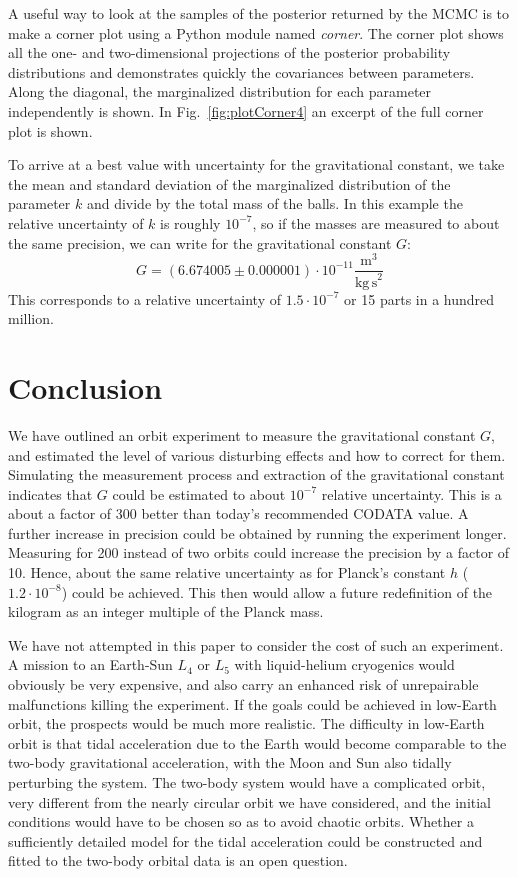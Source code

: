 \documentclass[prb,preprint]{revtex4-1}
\begin{document}
A useful way to look at the samples of the posterior returned by the MCMC is to make a corner plot using a Python module named \textit{corner}.\cite{corner} The corner plot shows all the one- and two-dimensional projections of the posterior probability distributions and demonstrates quickly the covariances between parameters. Along the diagonal, the marginalized distribution for each parameter independently is shown.
In Fig.~\ref{fig:plotCorner4} an excerpt of the full corner plot is shown. 

To arrive at a best value with uncertainty for the gravitational constant, we take the mean and standard deviation of the marginalized distribution of the parameter $k$ and divide by the total mass of the balls. In this example the relative uncertainty of $k$ is roughly $10^{-7}$, so if the masses are measured to about the same precision, we can write for the gravitational constant $G$:
\begin{equation}\label{Gfit}
G = \left(6.674005 \pm 0.000001 \right) \cdot 10^{-11}  \frac{\mathrm{m}^3}{\mathrm{kg \, s}^2}
\end{equation}
This corresponds to a relative uncertainty of $1.5 \cdot 10^{-7}$ or 15 parts in a hundred million.

\section{Conclusion}
We have outlined an orbit experiment to measure the gravitational
constant $G$, and estimated the level of various disturbing effects
and how to correct for them.  Simulating the measurement process and
extraction of the gravitational constant indicates that $G$ could be
estimated to about $10^{-7}$ relative uncertainty.  This is a about a
factor of 300 better than today's recommended CODATA value. A further increase in precision could be obtained by running the experiment longer. Measuring for 200 instead of two orbits could increase the precision by a factor of 10.
Hence, about the same relative uncertainty as for Planck's constant
$h$ ($1.2 \cdot 10^{-8}$)\cite{CODATA16} could be achieved. This then
would allow a future redefinition of the kilogram as an integer
multiple of the Planck mass.

We have not attempted in this paper to consider the cost of such an
experiment.  A mission to an Earth-Sun $L_4$ or $L_5$ with
liquid-helium cryogenics would obviously be very expensive, and also
carry an enhanced risk of unrepairable malfunctions killing the
experiment.  If the goals could be achieved in low-Earth orbit, the
prospects would be much more realistic.  The difficulty in low-Earth
orbit is that tidal acceleration due to the Earth would become
comparable to the two-body gravitational acceleration, with the Moon
and Sun also tidally perturbing the system.  The two-body system would
have a complicated orbit, very different from the nearly circular
orbit we have considered, and the initial conditions would have to be
chosen so as to avoid chaotic orbits.  Whether a sufficiently detailed
model for the tidal acceleration could be constructed and fitted to
the two-body orbital data is an open question.
\end{document}

